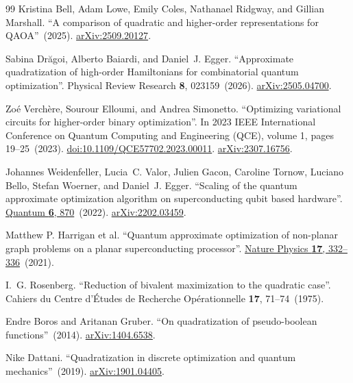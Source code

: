 \documentclass[a4paper,onecolumn,11pt,unpublished]{quantumarticle}
\theoremstyle{remark}
\begin{document}
\begin{thebibliography}{99}
Kristina Bell, Adam Lowe, Emily Coles, Nathanael Ridgway, and Gillian Marshall.
\newblock ``A comparison of quadratic and higher-order representations for QAOA''~(2025).
\newblock \href{http://arxiv.org/abs/2509.20127}{arXiv:2509.20127}.

Sabina Dr{\u a}goi, Alberto Baiardi, and Daniel~J. Egger.
\newblock ``Approximate quadratization of high-order Hamiltonians for combinatorial quantum optimization''.
\newblock Physical Review Research {\bf 8}, 023159~(2026).
\newblock \href{http://arxiv.org/abs/2505.04700}{arXiv:2505.04700}.

Zo{\'e} Verch{\`e}re, Sourour Elloumi, and Andrea Simonetto.
\newblock ``Optimizing variational circuits for higher-order binary optimization''.
\newblock In 2023 IEEE International Conference on Quantum Computing and Engineering (QCE), volume 1, pages 19--25~(2023).
\newblock \href{https://dx.doi.org/10.1109/QCE57702.2023.00011}{doi:10.1109/QCE57702.2023.00011}.
\newblock \href{http://arxiv.org/abs/2307.16756}{arXiv:2307.16756}.

Johannes Weidenfeller, Lucia~C. Valor, Julien Gacon, Caroline Tornow, Luciano Bello, Stefan Woerner, and Daniel~J. Egger.
\newblock ``Scaling of the quantum approximate optimization algorithm on superconducting qubit based hardware''.
\newblock \href{https://dx.doi.org/10.22331/q-2022-12-07-870}{Quantum {\bf 6}, 870}~(2022).
\newblock \href{http://arxiv.org/abs/2202.03459}{arXiv:2202.03459}.

Matthew P. Harrigan et al.
\newblock ``Quantum approximate optimization of non-planar graph problems on a planar superconducting processor''.
\newblock \href{https://doi.org/10.1038/s41567-020-01105-y}{Nature Physics {\bf 17}, 332--336}~(2021).


I.~G. Rosenberg.
\newblock ``Reduction of bivalent maximization to the quadratic case''.
\newblock Cahiers du Centre d'\'Etudes de Recherche Op\'erationnelle {\bf 17}, 71--74~(1975).

Endre Boros and Aritanan Gruber.
\newblock ``On quadratization of pseudo-boolean functions''~(2014).
\newblock \href{http://arxiv.org/abs/1404.6538}{arXiv:1404.6538}.

Nike Dattani.
\newblock ``Quadratization in discrete optimization and quantum mechanics''~(2019).
\newblock \href{http://arxiv.org/abs/1901.04405}{arXiv:1901.04405}.


\end{thebibliography}
\end{document}

